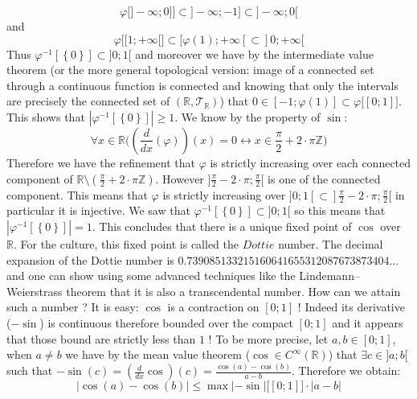 \begin{solution}
    \[
        \varphi\big[]-\infty;0]\big]\subset]-\infty;-1]\subset]-\infty;0[
    \]
    and
    \[
        \varphi\big[[1;+\infty[\big]\subset[\varphi\left(1\right);+\infty\left[\subset\right]0;+\infty[
    \]
    Thus \( \varphi^{-1}\left[\left\{0\right\}\right]\subset]0;1[ \) and moreover we have by the intermediate value theorem (or the more general topological version: image of a connected set through a continuous function is connected and knowing that only the intervals are precisely the connected set of \( \left(\mathbb{R},\mathcal{T}_{\mathbb{R}}\right) \)) that \( 0\in\left[-1;\varphi\left(1\right)\right]\subset\varphi\big[\left[0;1\right]\big] \). This shows that \( |\varphi^{-1}\left[\left\{0\right\}\right]|\geq 1 \). We know by the property of \( \sin \):
    \[
        \forall x\in\mathbb{R}\big(\left(\frac{d}{dx}\left(\varphi\right)\right)\left(x\right)=0\leftrightarrow x\in\frac{\pi}{2}+2\cdot\pi\mathbb{Z}\big)
    \]
    Therefore we have the refinement that \( \varphi \) is strictly increasing over each connected component of \( \mathbb{R}\setminus\left(\frac{\pi}{2}+2\cdot\pi\mathbb{Z}\right) \). However \( ]\frac{\pi}{2}-2\cdot\pi;\frac{\pi}{2}[ \) is one of the connected component. This means that \( \varphi \) is strictly increasing over \( ]0;1\left[\subset\right]\frac{\pi}{2}-2\cdot\pi;\frac{\pi}{2}[ \) in particular it is injective. We saw that \( \varphi^{-1}\left[\left\{0\right\}\right]\subset]0;1[ \) so this means that \( |\varphi^{-1}\left[\left\{0\right\}\right]|=1 \). This concludes that there is a unique fixed point of \( \cos \) over \( \mathbb{R} \). For the culture, this fixed point is called the \( \textit{Dottie} \) number. The decimal expansion of the Dottie number is \( 0.739085133215160641655312087673873404... \) and one can show using some advanced techniques like the Lindemann–Weierstrass theorem that it is also a transcendental number. How can we attain such a number ? It is easy: \( \cos \) is a contraction on \( \left[0;1\right] \) ! Indeed its derivative (\( -\sin \)) is continuous therefore bounded over the compact \( \left[0;1\right] \) and it appears that those bound are strictly less than \( 1 \) ! To be more precise, let \( a,b\in\left[0;1\right] \), when \( a\neq b \) we have by the mean value theorem (\( \cos\in C^{\infty}\left(\mathbb{R}\right) \)) that \( \exists c\in]a;b[ \) such that \( -\sin\left(c\right)=\left(\frac{d}{dx}\cos\right)\left(c\right)=\frac{\cos\left(a\right)-\cos\left(b\right)}{a-b} \). Therefore we obtain:
    \[
        |\cos\left(a\right)-\cos\left(b\right)|\leq \max|-\sin|\big[\left[0;1\right]\big]\cdot|a-b|
\]
\end{solution}
